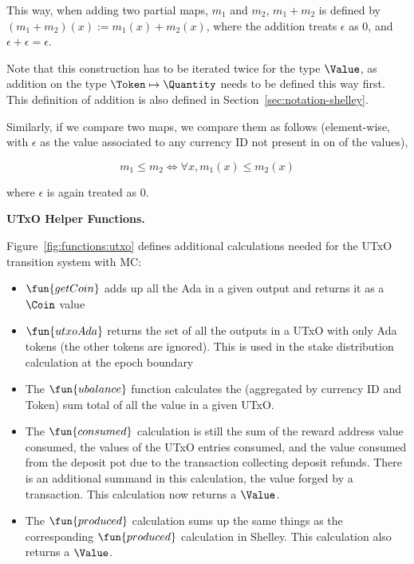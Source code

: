 This way, when adding two partial maps, $m_1$ and $m_2$, $m_1 + m_2$ is defined
by $(m_1 + m_2)(x) := m_1(x) + m_2(x)$, where the addition treats $\epsilon$ as
$0$, and $\epsilon + \epsilon = \epsilon$.

Note that this construction has to be iterated twice for the type $\Value$, as
addition on the type $\Token \mapsto \Quantity$ needs to be defined this way first.
This definition of addition is also defined in
Section~\ref{sec:notation-shelley}.

Similarly, if we compare two maps, we compare them as follows (element-wise,
with $\epsilon$ as the value associated to any currency ID not present in on of
the values),

\[ m_1 \leq m_2 \Leftrightarrow \forall x, m_1(x) \leq m_2(x) \]

where $\epsilon$ is again treated as $0$.

\textbf{UTxO Helper Functions.}

Figure~\ref{fig:functions:utxo} defines additional calculations needed for the
UTxO transition system with MC:

\begin{itemize}

  \item $\fun{getCoin}$ adds up all the Ada in a given output and returns it as a
  $\Coin$ value

  \item $\fun{utxoAda}$ returns the set of all the outputs in a UTxO with only Ada
  tokens (the other tokens are ignored). This is used in the stake distribution
  calculation at the epoch boundary

  \item
    The $\fun{ubalance}$ function calculates the (aggregated by currency ID and
    Token) sum total of all the value in a given UTxO.

  \item The $\fun{consumed}$ calculation is still the sum of the reward address
   value consumed, the values of the UTxO entries consumed,
   and the value consumed from the deposit pot due
   to the transaction collecting deposit refunds. There is an additional
   summand in this calculation, the value forged by a transaction.
   This calculation now returns a $\Value$.

  \item The $\fun{produced}$ calculation sums up the same things
  as the corresponding $\fun{produced}$ calculation in Shelley.
  This calculation also returns a $\Value$.
\end{itemize}

